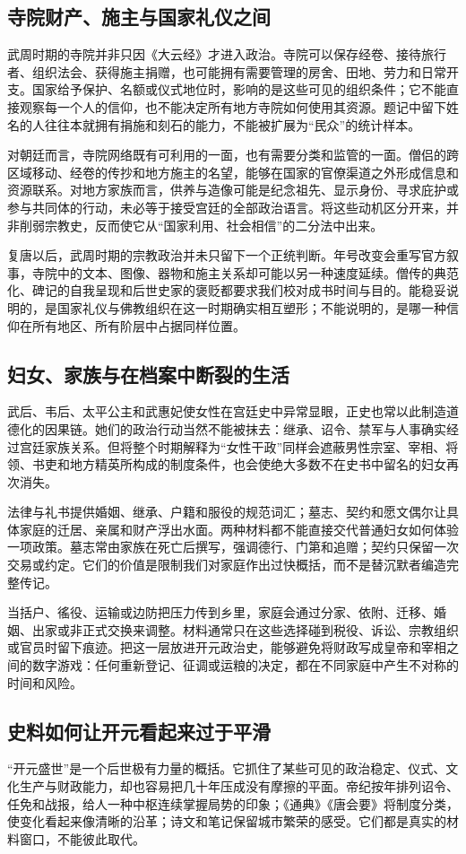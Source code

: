 \subsection{寺院财产、施主与国家礼仪之间}
武周时期的寺院并非只因《大云经》才进入政治。寺院可以保存经卷、接待旅行者、组织法会、获得施主捐赠，也可能拥有需要管理的房舍、田地、劳力和日常开支。国家给予保护、名额或仪式地位时，影响的是这些可见的组织条件；它不能直接观察每一个人的信仰，也不能决定所有地方寺院如何使用其资源。题记中留下姓名的人往往本就拥有捐施和刻石的能力，不能被扩展为“民众”的统计样本。

对朝廷而言，寺院网络既有可利用的一面，也有需要分类和监管的一面。僧侣的跨区域移动、经卷的传抄和地方施主的名望，能够在国家的官僚渠道之外形成信息和资源联系。对地方家族而言，供养与造像可能是纪念祖先、显示身份、寻求庇护或参与共同体的行动，未必等于接受宫廷的全部政治语言。将这些动机区分开来，并非削弱宗教史，反而使它从“国家利用、社会相信”的二分法中出来。

复唐以后，武周时期的宗教政治并未只留下一个正统判断。年号改变会重写官方叙事，寺院中的文本、图像、器物和施主关系却可能以另一种速度延续。僧传的典范化、碑记的自我呈现和后世史家的褒贬都要求我们校对成书时间与目的。能稳妥说明的，是国家礼仪与佛教组织在这一时期确实相互塑形；不能说明的，是哪一种信仰在所有地区、所有阶层中占据同样位置。

\subsection{妇女、家族与在档案中断裂的生活}
武后、韦后、太平公主和武惠妃使女性在宫廷史中异常显眼，正史也常以此制造道德化的因果链。她们的政治行动当然不能被抹去：继承、诏令、禁军与人事确实经过宫廷家族关系。但将整个时期解释为“女性干政”同样会遮蔽男性宗室、宰相、将领、书吏和地方精英所构成的制度条件，也会使绝大多数不在史书中留名的妇女再次消失。

法律与礼书提供婚姻、继承、户籍和服役的规范词汇；墓志、契约和愿文偶尔让具体家庭的迁居、亲属和财产浮出水面。两种材料都不能直接交代普通妇女如何体验一项政策。墓志常由家族在死亡后撰写，强调德行、门第和追赠；契约只保留一次交易或约定。它们的价值是限制我们对家庭作出过快概括，而不是替沉默者编造完整传记。

当括户、徭役、运输或边防把压力传到乡里，家庭会通过分家、依附、迁移、婚姻、出家或非正式交换来调整。材料通常只在这些选择碰到税役、诉讼、宗教组织或官员时留下痕迹。把这一层放进开元政治史，能够避免将财政写成皇帝和宰相之间的数字游戏：任何重新登记、征调或运粮的决定，都在不同家庭中产生不对称的时间和风险。

\subsection{史料如何让开元看起来过于平滑}
“开元盛世”是一个后世极有力量的概括。它抓住了某些可见的政治稳定、仪式、文化生产与财政能力，却也容易把几十年压成没有摩擦的平面。帝纪按年排列诏令、任免和战报，给人一种中枢连续掌握局势的印象；《通典》《唐会要》将制度分类，使变化看起来像清晰的沿革；诗文和笔记保留城市繁荣的感受。它们都是真实的材料窗口，不能彼此取代。

